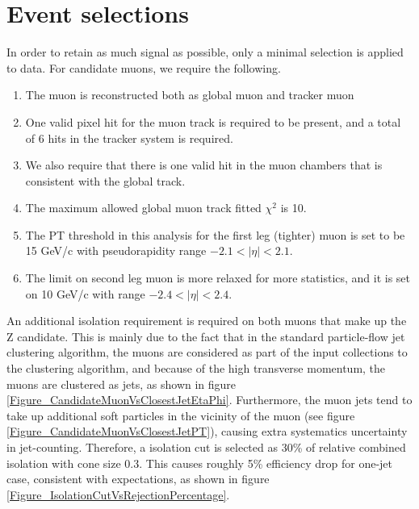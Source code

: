 \documentclass{cmspaper2}
\begin{document}
\section{Event selections}

In order to retain as much signal as possible, only a minimal selection is applied to data.
For candidate muons, we require the following.

\begin{enumerate}
\item The muon is reconstructed both as global muon and tracker muon
\item One valid pixel hit for the muon track is required to be present, and a total of 6 hits in the tracker system is required.
\item We also require that there is one valid hit in the muon chambers that is consistent with the global track.
\item The maximum allowed global muon track fitted $\chi^2$ is 10.
\item The PT threshold in this analysis for the first leg (tighter) muon is set to be 15 GeV/c with pseudorapidity range $-2.1 < |\eta| < 2.1$.
\item The limit on second leg muon is more relaxed for more statistics, and it is set on 10 GeV/c with range $-2.4 < |\eta| < 2.4$.
\end{enumerate}

An additional isolation requirement is required on both muons that make up the Z candidate.
This is mainly due to the fact that in the standard particle-flow jet clustering algorithm, the muons are considered as part
of the input collections to the clustering algorithm, and because of the high transverse momentum, the muons are clustered
as jets, as shown in figure \ref{Figure_CandidateMuonVsClosestJetEtaPhi}.  Furthermore, the muon jets tend to take up additional soft particles
in the vicinity of the muon (see figure \ref{Figure_CandidateMuonVsClosestJetPT}), causing extra systematics uncertainty in jet-counting.
Therefore, a isolation cut is selected as 30\% of relative combined isolation with cone size 0.3.  This causes roughly 5\%
efficiency drop for one-jet case, consistent with expectations, as shown in figure \ref{Figure_IsolationCutVsRejectionPercentage}.
\end{document}
